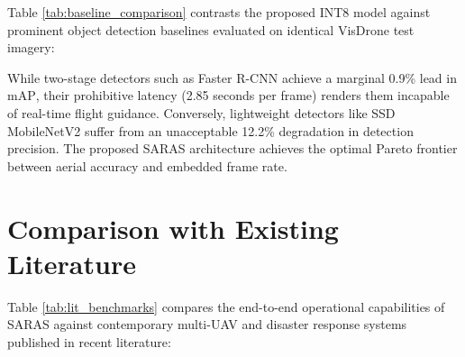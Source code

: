Table \ref{tab:baseline_comparison} contrasts the proposed INT8 model against prominent object detection baselines evaluated on identical VisDrone test imagery:

\begin{table}[htbp]
\centering
\caption{Comparative evaluation against established object detection baseline models}
\label{tab:baseline_comparison}
\vspace{0.2cm}
\end{table}

While two-stage detectors such as Faster R-CNN achieve a marginal 0.9\% lead in $\text{mAP}$, their prohibitive latency (2.85 seconds per frame) renders them incapable of real-time flight guidance. Conversely, lightweight detectors like SSD MobileNetV2 suffer from an unacceptable 12.2\% degradation in detection precision. The proposed SARAS architecture achieves the optimal Pareto frontier between aerial accuracy and embedded frame rate.

\section{Comparison with Existing Literature}

Table \ref{tab:lit_benchmarks} compares the end-to-end operational capabilities of SARAS against contemporary multi-UAV and disaster response systems published in recent literature:

